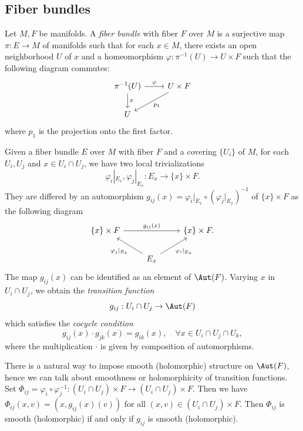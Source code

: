 \subsection{Fiber bundles}

    \begin{definition}\label{def:fiber_bundle_over_manifolds}
        Let \(M,F\) be manifolds.
        A \emph{fiber bundle} with fiber \(F\) over \(M\) is a surjective map \(\pi: E \to M\) of manifolds
        such that for each \(x \in M\), there exists an open neighborhood \(U\) of \(x\) and a homeomorphism
        \(\varphi: \pi^{-1}(U) \to U \times F\) such that the following diagram commutes:
        \[
            \begin{tikzcd}
                \pi^{-1}(U) \arrow{r}{\varphi} \arrow{d}{\pi} & U \times F \arrow{dl}{p_1}  \\
                U &
            \end{tikzcd}
        \]
        where \(p_1\) is the projection onto the first factor.
    \end{definition}

    Given a fiber bundle \(E\) over \(M\) with fiber \(F\) and a covering \(\{U_i\}\) of \(M\), for each \(U_i,U_j\) and \(x \in U_i \cap U_j\), we have two local trivializations
    \[
        \varphi_i|_{E_x}, \varphi_j|_{E_x}: E_x \to \{x\} \times F.
    \]
    They are differed by an automorphism \(g_{ij}(x) = \varphi_i|_{E_x} \circ (\varphi_j|_{E_x})^{-1}\) of \(\{x\} \times F\) as the following diagram
    \[
        \begin{tikzcd}
            \{x\} \times F \arrow[rr,"g_{ij}(x)"] & & \{x\} \times F. \\
            & E_x \arrow[lu,"\varphi_j|_{E_x}"] \arrow[ru,swap,"\varphi_i|_{E_x}"] &
        \end{tikzcd}
    \]
    The map \(g_{ij}(x)\) can be identified as an element of \(\Aut(F)\).
    Varying \(x\) in \(U_i \cap U_j\), we obtain the \emph{transition function}
    \[
        g_{ij}: U_i \cap U_j \to \Aut(F)
    \]
    which satisfies the \emph{cocycle condition}
    \[
        g_{ij}(x) \cdot g_{jk}(x) = g_{ik}(x), \quad \forall x \in U_i \cap U_j \cap U_k,
    \]
    where the multiplication \(\cdot\) is given by composition of automorphisms.

    There is a natural way to impose smooth (holomorphic) structure on \(\Aut(F)\),
    hence we can talk about smoothness or holomorphicity of transition functions.
    Set \(\Phi_{ij} = \varphi_i \circ \varphi_j^{-1}: (U_i \cap U_j) \times F \to (U_i \cap U_j) \times F\).
    Then we have \(\Phi_{ij}(x,v) = (x, g_{ij}(x)(v))\) for all \((x,v) \in (U_i \cap U_j) \times F\).
    Then \(\Phi_{ij}\) is smooth (holomorphic) if and only if \(g_{ij}\) is smooth (holomorphic).

